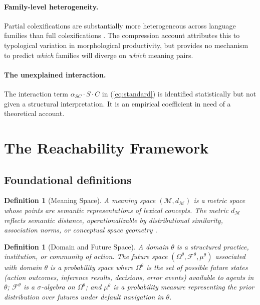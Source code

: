 \documentclass[12pt]{article}
\theoremstyle{rthm}
\theoremstyle{rdef}
\newtheorem{definition}[theorem]{Definition}
\theoremstyle{remark}
\newcommand{\M}{\mathcal{M}}
\newcommand{\Om}{\Omega}
\newcommand{\dM}{d_{\mathcal{M}}}
\begin{document}
\paragraph{Family-level heterogeneity.}
Partial colexifications are substantially more heterogeneous across language
families than full colexifications \cite{brochhagen2026}. The compression account
attributes this to typological variation in morphological productivity, but
provides no mechanism to predict \emph{which} families will diverge on
\emph{which} meaning pairs.

\paragraph{The unexplained interaction.}
The interaction term $\alpha_{SC} \cdot S \cdot C$ in (\ref{eq:standard}) is
identified statistically but not given a structural interpretation. It is an
empirical coefficient in need of a theoretical account.

\section{The Reachability Framework}
\label{sec:framework}

\subsection{Foundational definitions}

\begin{definition}[Meaning Space]
A \emph{meaning space} $(\M, \dM)$ is a metric space whose points are semantic
representations of lexical concepts. The metric $\dM$ reflects semantic
distance, operationalizable by distributional similarity, association norms, or
conceptual space geometry \cite{gardenfors2000}.
\end{definition}

\begin{definition}[Domain and Future Space]
A \emph{domain} $\theta$ is a structured practice, institution, or community of
action. The \emph{future space} $(\Om^{\theta}, \mathcal{F}^{\theta},
\mu^{\theta})$ associated with domain $\theta$ is a probability space where
$\Om^{\theta}$ is the set of possible future states (action outcomes, inference
results, decisions, error events) available to agents in $\theta$;
$\mathcal{F}^{\theta}$ is a $\sigma$-algebra on $\Om^{\theta}$; and $\mu^{\theta}$
is a probability measure representing the prior distribution over futures under
default navigation in $\theta$.
\end{definition}
\end{document}
